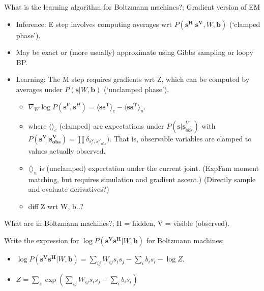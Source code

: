 \documentclass{article}
\begin{document}
What is the learning algorithm for Boltzmann machines?; Gradient version of EM \begin{itemize}
\item Inference: E step involves computing averages wrt $P(\mathbf{s^H|s^V}, W, \mathbf{b})$ (`clamped phase').
\item May be exact or (more usually) approximate using Gibbs sampling or loopy BP.
\item Learning: The M step requires gradients wrt Z, which can be computed by averages under $P(\mathbf{s}|W, \mathbf{b})$ (`unclamped phase'). \begin{itemize}
    \item $\nabla_W\log P(\mathbf{s}^V, \mathbf{s}^H)=\langle \mathbf{ss^T} \rangle_c - \langle \mathbf{ss^T} \rangle_u$.
    \item where $\langle \rangle_c$ (clamped) are expectations under $P(\mathbf{s|s}^V_{obs})$ with $P(\mathbf{s^V|s^V_{obs}})=\prod\delta_{s^V_i, s^V_{i, obs}})$. That is, observable variables are clamped to values actually observed.
    \item $\langle \rangle_u$ is (unclamped) expectation under the current joint. (ExpFam moment matching, but requires simulation and gradient ascent.) (Directly sample and evaluate derivatives?)
    \item diff Z wrt W, b..?
\end{itemize}
\end{itemize}

What are  in Boltzmann machines?; H = hidden, V = visible (observed).

Write the expression for $\log P(\mathbf{s^Vs^H}|W, \mathbf{b})$ for Boltzmann machines; 
    \begin{itemize}
        \item $\log P(\mathbf{s^Vs^H}|W, \mathbf{b})=\sum_{ij}W_{ij}s_is_j-\sum_ib_is_i - \log Z$.
        \item $Z=\sum_s \exp(\sum_{ij}W_{ij}s_is_j - \sum_i b_i s_i)$
    \end{itemize}
\end{document}
